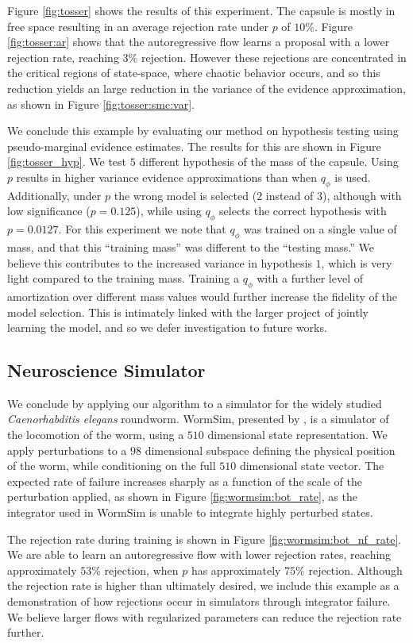 

Figure \ref{fig:tosser} shows the results of this experiment.
The capsule is mostly in free space resulting in an average rejection rate under $p$ of $10\%$.
Figure \ref{fig:tosser:ar} shows that the autoregressive flow learns a proposal with a lower rejection rate, reaching $3\%$ rejection.
However these rejections are concentrated in the critical regions of state-space, where chaotic behavior occurs, and so this reduction yields an large reduction in the variance of the evidence approximation, as shown in Figure \ref{fig:tosser:smc:var}.



We conclude this example by evaluating our method on hypothesis testing using pseudo-marginal evidence estimates.
The results for this are shown in Figure \ref{fig:tosser_hyp}.
We test $5$ different hypothesis of the mass of the capsule.
Using $p$ results in higher variance evidence approximations than when $q_{\phi}$ is used. 
Additionally, under $p$ the wrong model is selected ($2$ instead of $3$), although with low significance ($p=0.125$), while using $q_{\phi}$ selects the correct hypothesis with $p=0.0127$.
For this experiment we note that $q_{\phi}$ was trained on a single value of mass, and that this ``training mass'' was different to the ``testing mass.''
We believe this contributes to the increased variance in hypothesis $1$, which is very light compared to the training mass.
Training a $q_{\phi}$ with a further level of amortization over different mass values would further increase the fidelity of the model selection.
This is intimately linked with the larger project of jointly learning the model, and so we defer investigation to future works.

\subsection{Neuroscience Simulator}
\label{sec:sub:wormsim}
We conclude by applying our algorithm to a simulator for the widely studied \emph{Caenorhabditis elegans} roundworm.
WormSim, presented by \citet{boyle2012gait}, is a simulator of the locomotion of the worm, using a $510$ dimensional state representation.
We apply perturbations to a $98$ dimensional subspace defining the physical position of the worm, while conditioning on the full $510$ dimensional state vector.
The expected rate of failure increases sharply as a function of the scale of the perturbation applied, as shown in Figure \ref{fig:wormsim:bot_rate}, as the integrator used in WormSim is unable to integrate highly perturbed states.

The rejection rate during training is shown in Figure \ref{fig:wormsim:bot_nf_rate}.
We are able to learn an autoregressive flow with lower rejection rates, reaching approximately $53\%$ rejection, when $p$ has approximately $75\%$ rejection.
Although the rejection rate is higher than ultimately desired, we include this example as a demonstration of how rejections occur in simulators through integrator failure.
We believe larger flows with regularized parameters can reduce the rejection rate further.
